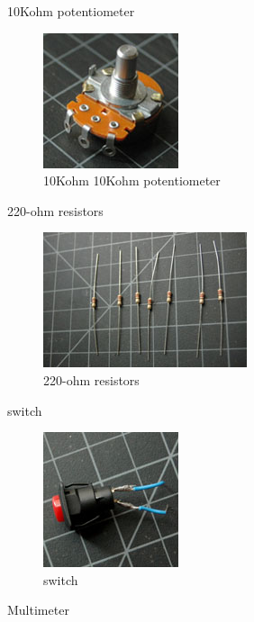 10Kohm potentiometer

\begin{figure}[!htb]
 \centering
 \includegraphics[scale=0.8]{img/electronics/potentiometer.jpg}
 \caption{10Kohm 10Kohm potentiometer}
 \label{10Kohm potentiometer}
\end{figure}

220-ohm resistors

\begin{figure}[!htb]
 \centering
 \includegraphics[scale=0.8]{img/electronics/resistors.jpg}
 \caption{220-ohm resistors}
 \label{220-ohm resistors}
\end{figure}

switch

\begin{figure}[!htb]
 \centering
 \includegraphics[scale=0.8]{img/electronics/switch.jpg}
 \caption{switch}
 \label{switch}
\end{figure}

Multimeter


